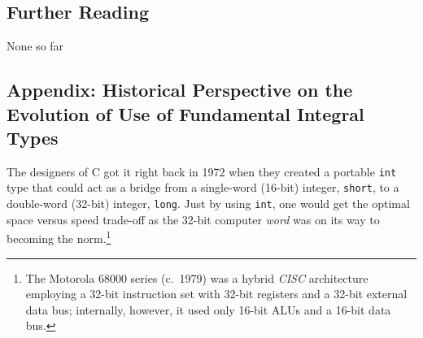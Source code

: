 \subsection[Further Reading]{Further Reading}\label{further-reading}

None so far

\subsection[Appendix: Historical Perspective on the Evolution of Use of Fundamental Integral Types]{Appendix: Historical Perspective on the Evolution of Use of Fundamental Integral Types}\label{longlong-appendix}
\label{historical-perspective-on-the-evolution-of-use-of-fundamental-integral-types}

The designers of C got it right back in 1972 when
they created a portable \texttt{int} type that could act as a bridge
from a single-word (16-bit) integer, \texttt{short}, to a double-word
(32-bit) integer, \texttt{long}. Just by using \texttt{int}, one would
get the optimal space versus speed trade-off as the 32-bit computer \emph{word}
was on its way to becoming the norm.{\cprotect\footnote{The Motorola
68000 series (c.~1979) was a hybrid \emph{CISC} architecture employing
a 32-bit instruction set with 32-bit registers and a 32-bit external
data bus; internally, however, it used only 16-bit ALUs and a 16-bit
  data bus.}}

